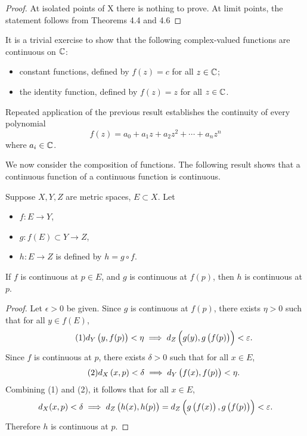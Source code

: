\begin{proof}
At isolated points of X there is nothing to prove. At limit points, the statement follows from Theorems 4.4 and 4.6
\end{proof}

\begin{example}
It is a trivial exercise to show that the following complex-valued functions are continuous on $\mathbb C$:
\begin{itemize}
\item constant functions, defined by $f(z)=c$ for all $z\in\mathbb C$;
\item the identity function, defined by $f(z)=z$ for all $z\in\mathbb C$.
\end{itemize}
Repeated application of the previous result establishes the continuity of every polynomial
\[f(z)=a_0+a_1z+a_2z^2+\cdots+a_nz^n\]
where $a_i\in\mathbb C$.
\end{example}

We now consider the composition of functions. The following result shows that a continuous function of a continuous function is continuous.

\begin{proposition}
Suppose $X,Y,Z$ are metric spaces, $E\subset X$. Let 
\begin{itemize}
\item $f:E\to Y$,
\item $g:f(E)\subset Y\to Z$,
\item $h:E\to Z$ is defined by $h=g\circ f$.
\end{itemize}
If $f$ is continuous at $p\in E$, and $g$ is continuous at $f(p)$, then $h$ is continuous at $p$.
\end{proposition}

\begin{proof}
Let $\epsilon>0$ be given. Since $g$ is continuous at $f(p)$, there exists $\eta>0$ such that for all $y\in f(E)$,
\begin{equation*}\tag{1}
d_Y\left(y,f(p)\right)<\eta\implies d_Z\left(g(y),g\left(f(p)\right)\right)<\varepsilon.
\end{equation*}
Since $f$ is continuous at $p$, there exists $\delta>0$ such that for all $x\in E$,
\begin{equation*}\tag{2}
d_X\left(x,p\right)<\delta\implies d_Y\left(f(x),f(p)\right)<\eta.
\end{equation*}
Combining (1) and (2), it follows that for all $x\in E$,
\[d_X(x,p)<\delta\implies d_Z\left(h(x),h(p)\right)=d_Z\left(g\left(f(x)\right),g\left(f(p)\right)\right)<\varepsilon.\]
Therefore $h$ is continuous at $p$. 
\end{proof}

